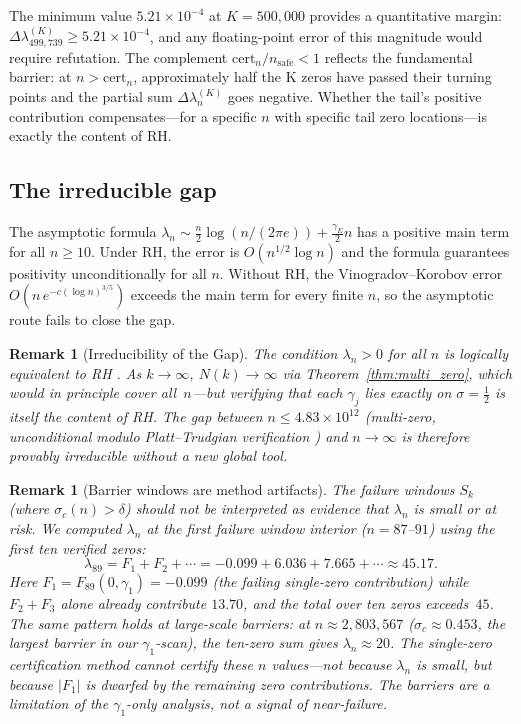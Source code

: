 \documentclass[11pt]{article}
\newtheorem{remark}[theorem]{Remark}
\begin{document}
The minimum value $5.21\times10^{-4}$ at $K=500{,}000$ provides a quantitative margin:
$\Delta\lambda_{499{,}739}^{(K)} \ge 5.21\times10^{-4}$, and any floating-point error of this
magnitude would require refutation.  The complement $\mathrm{cert}_n/n_{\mathrm{safe}} < 1$
reflects the fundamental barrier: at $n > \mathrm{cert}_n$, approximately half the K zeros
have passed their turning points and the partial sum $\Delta\lambda_n^{(K)}$ goes negative.
Whether the tail's positive contribution compensates---for a specific $n$ with specific tail zero
locations---is exactly the content of RH.

\subsection{The irreducible gap}

The asymptotic formula $\lambda_n \sim \tfrac{n}{2}\log(n/(2\pi e)) + \tfrac{\gamma_E}{2}n$
has a positive main term for all $n \ge 10$. Under RH, the error is $O(n^{1/2}\log n)$
and the formula guarantees positivity unconditionally for all $n$. Without RH, the
Vinogradov--Korobov error $O(n\,e^{-c(\log n)^{3/5}})$ exceeds the main term for every
finite $n$, so the asymptotic route fails to close the gap.

\begin{remark}[Irreducibility of the Gap]
The condition $\lambda_n > 0$ for \emph{all} $n$ is logically equivalent to RH \cite{li1997}.
As $k\to\infty$, $N(k)\to\infty$ via Theorem~\ref{thm:multi_zero}, which would in principle
cover all~$n$---but verifying that each $\gamma_j$ lies exactly on $\sigma=\tfrac{1}{2}$
is itself the content of RH. The gap between $n \le 4.83\times10^{12}$ (multi-zero, unconditional modulo
Platt--Trudgian verification \cite{platt2021}) and $n\to\infty$ is therefore provably irreducible without a new global tool.
\end{remark}

\begin{remark}[Barrier windows are method artifacts]
\label{rem:barriers_artifact}
The failure windows $S_k$ (where $\sigma_c(n) > \delta$) should not be interpreted as
evidence that $\lambda_n$ is small or at risk. We computed $\lambda_n$ at the first failure
window interior ($n = 87$--$91$) using the first ten verified zeros:
\[
  \lambda_{89} = F_1 + F_2 + \cdots = -0.099 + 6.036 + 7.665 + \cdots \approx 45.17.
\]
Here $F_1 = F_{89}(0, \gamma_1) = -0.099$ (the failing single-zero contribution) while
$F_2 + F_3$ alone already contribute $13.70$, and the total over ten zeros exceeds~$45$.
The same pattern holds at large-scale barriers: at $n \approx 2{,}803{,}567$
($\sigma_c \approx 0.453$, the largest barrier in our $\gamma_1$-scan), the ten-zero sum gives
$\lambda_n \approx 20$. The single-zero certification method cannot certify these $n$ values---not
because $\lambda_n$ is small, but because $|F_1|$ is dwarfed by the remaining zero contributions.
The barriers are a limitation of the $\gamma_1$-only analysis, not a signal of near-failure.
\end{remark}
\end{document}
